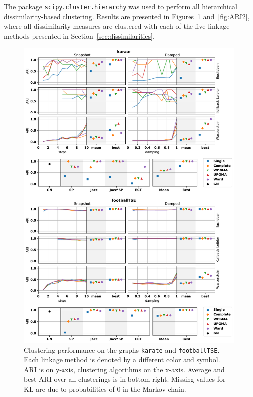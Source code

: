 The package \texttt{scipy.cluster.hierarchy} \citep{Virtanen2020} was used to perform all hierarchical dissimilarity-based clustering.
Results are presented in Figures~\ref{fig:ARI1} and~\ref{fig:ARI2}, where all dissimilarity measures are clustered with each of the five linkage methods presented in Section~\ref{sec:dissimilarities}.

\begin{figure}
  \centering
  \includegraphics[height=.95\textheight]{power/ARI1.pdf}
  \caption[Experimental clustering results for \texttt{karate} and \texttt{footballTSE}]{Clustering performance on the graphs \texttt{karate} and \texttt{footballTSE}. Each linkage method is denoted by a different color and symbol.
  ARI is on y-axis, clustering algorithms on the x-axis.
  Average and best ARI over all clusterings is in bottom right. Missing values for KL are due to probabilities of 0 in the Markov chain.}
  \label{fig:ARI1}
\end{figure}
